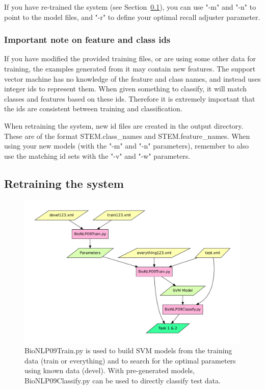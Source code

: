 \documentclass[a4paper,12pt]{article}
\begin{document}
If you have re-trained the system (see Section~\ref{sec-retraining}), you can
use "-m" and "-n" to point to the model files, and "-r" to define your optimal 
recall adjuster parameter.

\subsubsection{Important note on feature and class ids}

If you have modified the provided training files, or are using some other data
for training, the examples generated from it may contain new features. The
support vector machine has no knowledge of the feature and class names, and
instead uses integer ids to represent them. When given something to classify, it
will match classes and features based on these ids. Therefore it is extremely
important that the ids are consistent between training and classification.

When retraining the system, new id files are created in the output directory.
These are of the format STEM.class\_names and STEM.feature\_names. When using
your new models (with the "-m" and "-n" parameters), remember to also use the
matching id sets with the "-v" and "-w" parameters.

\subsection{Retraining the system}
\label{sec-retraining}

\begin{figure}[htb]
\begin{center}
\includegraphics[scale=0.4]{Figures/programs12.pdf}
\end{center}
\caption{BioNLP09Train.py is used to build SVM models from the training data
(train or everything) and to search for the optimal parameters using known data
(devel). With pre-generated models, BioNLP09Classify.py can be used to directly
classify test data. }
\label{fig-programs12}
\end{figure}
\end{document}
